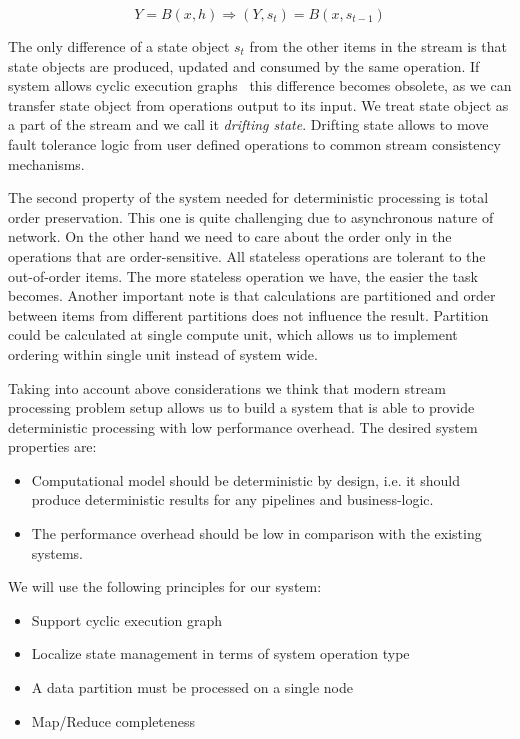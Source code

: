 \begin{equation}
\label{flink-contract}
Y = B(x, h) \Rightarrow (Y, s_t) = B(x, s_{t-1}) 
\end{equation}

The only difference of a state object $s_t$ from the other items in the stream is that state objects are produced, updated and consumed by the same operation. If system allows cyclic execution graphs~\cite{Murray:2013:NTD:2517349.2522738} this difference becomes obsolete, as we can transfer state object from operations output to its input. We treat state object as a part of the stream and we call it {\it drifting state}. Drifting state allows to move fault tolerance logic from user defined operations to common stream consistency mechanisms.

The second property of the system needed for deterministic processing is total order preservation. This one is quite challenging due to asynchronous nature of network. On the other hand we need to care about the order only in the operations that are order-sensitive. All stateless operations are tolerant to the out-of-order items. The more stateless operation we have, the easier the task becomes. Another important note is that calculations are partitioned and order between items from different partitions does not influence the result. Partition could be calculated at single compute unit, which allows us to implement ordering within single unit instead of system wide.

Taking into account above considerations we think that modern stream processing problem setup allows us to build a system that is able to provide deterministic processing with low performance overhead. The desired system properties are:
\begin{itemize}
    \item Computational model should be deterministic by design, i.e. it should produce deterministic results for any pipelines and business-logic.
    \item The performance overhead should be low in comparison with the existing systems.
\end{itemize}
We will use the following principles for our system:
\begin{itemize}
    \item Support cyclic execution graph
    \item Localize state management in terms of system operation type
    \item A data partition must be processed on a single node
    \item Map/Reduce completeness
\end{itemize}
